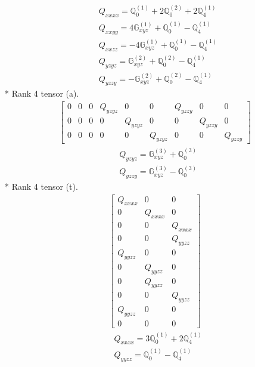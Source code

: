 \documentclass[fleqn,8pt,landscape]{jsarticle}
\begin{document}
\begin{align*}
& Q_{xxxx} = \mathbb{Q}_{0}^{(1)} + 2 \mathbb{Q}_{0}^{(2)} + 2 \mathbb{Q}_{4}^{(1)} \\
& Q_{xxyy} = 4 \mathbb{G}_{xyz}^{(1)} + \mathbb{Q}_{0}^{(1)} - \mathbb{Q}_{4}^{(1)} \\
& Q_{xxzz} = - 4 \mathbb{G}_{xyz}^{(1)} + \mathbb{Q}_{0}^{(1)} - \mathbb{Q}_{4}^{(1)} \\
& Q_{yzyz} = \mathbb{G}_{xyz}^{(2)} + \mathbb{Q}_{0}^{(2)} - \mathbb{Q}_{4}^{(1)} \\
& Q_{yzzy} = - \mathbb{G}_{xyz}^{(2)} + \mathbb{Q}_{0}^{(2)} - \mathbb{Q}_{4}^{(1)}
\end{align*}
* Rank 4 tensor (a).
\begin{align*}
\begin{bmatrix} 0 & 0 & 0 & Q_{yzyz} & 0 & 0 & Q_{yzzy} & 0 & 0 \\ 0 & 0 & 0 & 0 & Q_{yzyz} & 0 & 0 & Q_{yzzy} & 0 \\ 0 & 0 & 0 & 0 & 0 & Q_{yzyz} & 0 & 0 & Q_{yzzy} \end{bmatrix}
\end{align*}
\begin{align*}
& Q_{yzyz} = \mathbb{G}_{xyz}^{(3)} + \mathbb{Q}_{0}^{(3)} \\
& Q_{yzzy} = \mathbb{G}_{xyz}^{(3)} - \mathbb{Q}_{0}^{(3)}
\end{align*}
* Rank 4 tensor (t).
\begin{align*}
\begin{bmatrix} Q_{xxxx} & 0 & 0 \\ 0 & Q_{xxxx} & 0 \\ 0 & 0 & Q_{xxxx} \\ 0 & 0 & Q_{yyzz} \\ Q_{yyzz} & 0 & 0 \\ 0 & Q_{yyzz} & 0 \\ 0 & Q_{yyzz} & 0 \\ 0 & 0 & Q_{yyzz} \\ Q_{yyzz} & 0 & 0 \\ 0 & 0 & 0 \end{bmatrix}
\end{align*}
\begin{align*}
& Q_{xxxx} = 3 \mathbb{Q}_{0}^{(1)} + 2 \mathbb{Q}_{4}^{(1)} \\
& Q_{yyzz} = \mathbb{Q}_{0}^{(1)} - \mathbb{Q}_{4}^{(1)}
\end{align*}
\end{document}
